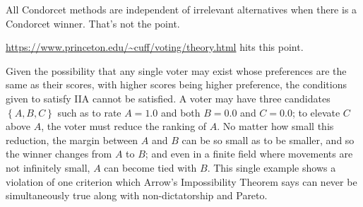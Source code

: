 All Condorcet methods are independent of irrelevant alternatives when there is a Condorcet winner.  That's not the point.

\url{https://www.princeton.edu/~cuff/voting/theory.html} hits this point.

Given the possibility that any single voter may exist whose preferences are the same as their scores, with higher scores being higher preference, the conditions given to satisfy IIA cannot be satisfied.  A voter may have three candidates $\left\{A,B,C\right\}$ such as to rate $A=1.0$ and both $B=0.0$ and $C=0.0$; to elevate $C$ above $A$, the voter must reduce the ranking of $A$.  No matter how small this reduction, the margin between $A$ and $B$ can be so small as to be smaller, and so the winner changes from $A$ to $B$; and even in a finite field where movements are not infinitely small, $A$ can become tied with $B$.  This single example shows a violation of one criterion which Arrow's Impossibility Theorem says can never be simultaneously true along with non-dictatorship and Pareto.